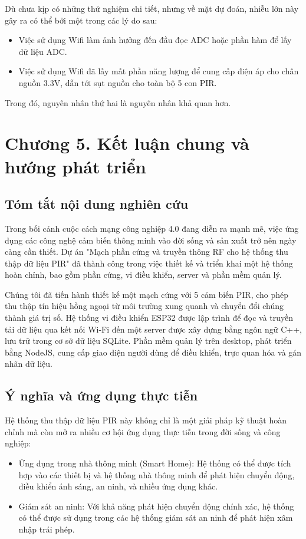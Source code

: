 \documentclass{article}
\begin{document}
Dù chưa kịp có những thử nghiệm chi tiết, nhưng về mặt dự đoán, nhiễu lớn này gây ra có thể bởi một trong các lý do sau:
\begin{itemize}
    \item Việc sử dụng Wifi làm ảnh hưởng đến đầu đọc ADC hoặc phần hàm để lấy dữ liệu ADC.
    \item Việc sử dụng Wifi đã lấy mất phần năng lượng để cung cấp điện áp cho chân nguồn 3.3V, dẫn tới sụt nguồn cho toàn bộ 5 con PIR.
\end{itemize}
Trong đó, nguyên nhân thứ hai là nguyên nhân khả quan hơn.
\cleardoublepage
\section*{Chương 5. Kết luận chung và hướng phát triển}
\setcounter{section}{5}
\setcounter{subsection}{0}

\subsection{Tóm tắt nội dung nghiên cứu}
Trong bối cảnh cuộc cách mạng công nghiệp 4.0 đang diễn ra mạnh mẽ, việc ứng dụng các công nghệ cảm biến thông minh vào đời sống và sản xuất trở nên ngày càng cần thiết. Dự án "Mạch phần cứng và truyền thông RF cho hệ thống thu thập dữ liệu PIR" đã thành công trong việc thiết kế và triển khai một hệ thống hoàn chỉnh, bao gồm phần cứng, vi điều khiển, server và phần mềm quản lý.

Chúng tôi đã tiến hành thiết kế một mạch cứng với 5 cảm biến PIR, cho phép thu thập tín hiệu hồng ngoại từ môi trường xung quanh và chuyển đổi chúng thành giá trị số. Hệ thống vi điều khiển ESP32 được lập trình để đọc và truyền tải dữ liệu qua kết nối Wi-Fi đến một server được xây dựng bằng ngôn ngữ C++, lưu trữ trong cơ sở dữ liệu SQLite. Phần mềm quản lý trên desktop, phát triển bằng NodeJS, cung cấp giao diện người dùng để điều khiển, trực quan hóa và gán nhãn dữ liệu.
\subsection{ Ý nghĩa và ứng dụng thực tiễn}
Hệ thống thu thập dữ liệu PIR này không chỉ là một giải pháp kỹ thuật hoàn chỉnh mà còn mở ra nhiều cơ hội ứng dụng thực tiễn trong đời sống và công nghiệp:
\begin{itemize}
    \item Ứng dụng trong nhà thông minh (Smart Home): Hệ thống có thể được tích hợp vào các thiết bị và hệ thống nhà thông minh để phát hiện chuyển động, điều khiển ánh sáng, an ninh, và nhiều ứng dụng khác.
    \item Giám sát an ninh: Với khả năng phát hiện chuyển động chính xác, hệ thống có thể được sử dụng trong các hệ thống giám sát an ninh để phát hiện xâm nhập trái phép.


\end{itemize}
\end{document}
